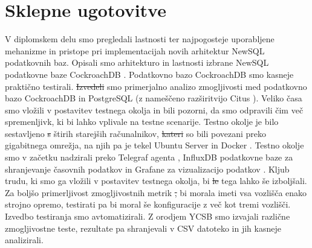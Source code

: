 \documentclass[a4paper, 12pt]{book}
\providecommand{\DIFaddtex}[1]{{\protect\color{blue}\uwave{#1}}} %
\providecommand{\DIFdeltex}[1]{{\protect\color{red}\sout{#1}}}                      %
\providecommand{\DIFaddbegin}{} %
\providecommand{\DIFaddend}{} %
\providecommand{\DIFdelbegin}{} %
\providecommand{\DIFdelend}{} %
\providecommand{\DIFadd}[1]{\texorpdfstring{\DIFaddtex{#1}}{#1}} %
\providecommand{\DIFdel}[1]{\texorpdfstring{\DIFdeltex{#1}}{}} %
\newcommand{\DIFscaledelfig}{0.5}
\newlength{\DIFdelgraphicswidth} %
\newlength{\DIFdelgraphicsheight} %
\newcommand{\DIFaddincludegraphics}[2][]{{\color{blue}\fbox{\DIFOincludegraphics[#1]{#2}}}} %
\newcommand{\DIFdelincludegraphics}[2][]{%
\sbox{\DIFdelgraphicsbox}{\DIFOincludegraphics[#1]{#2}}%
\settoboxwidth{\DIFdelgraphicswidth}{\DIFdelgraphicsbox} %
\settoboxtotalheight{\DIFdelgraphicsheight}{\DIFdelgraphicsbox} %
\scalebox{\DIFscaledelfig}{%
\parbox[b]{\DIFdelgraphicswidth}{\usebox{\DIFdelgraphicsbox}\\[-\baselineskip] \rule{\DIFdelgraphicswidth}{0em}}\llap{\resizebox{\DIFdelgraphicswidth}{\DIFdelgraphicsheight}{%
\setlength{\unitlength}{\DIFdelgraphicswidth}%
\begin{picture}(1,1)%
\thicklines\linethickness{2pt} %
{\color[rgb]{1,0,0}\put(0,0){\framebox(1,1){}}}%
{\color[rgb]{1,0,0}\put(0,0){\line( 1,1){1}}}%
{\color[rgb]{1,0,0}\put(0,1){\line(1,-1){1}}}%
\end{picture}%
}\hspace*{3pt}}} %
} %
\DeclareRobustCommand{\DIFaddbegin}{\DIFOaddbegin \let\includegraphics\DIFaddincludegraphics} %
\DeclareRobustCommand{\DIFaddend}{\DIFOaddend \let\includegraphics\DIFOincludegraphics} %
\DeclareRobustCommand{\DIFdelbegin}{\DIFOdelbegin \let\includegraphics\DIFdelincludegraphics} %
\DeclareRobustCommand{\DIFdelend}{\DIFOaddend \let\includegraphics\DIFOincludegraphics} %
\begin{document}
\chapter{Sklepne ugotovitve}

V diplomskem delu smo pregledali lastnosti  ter najpogosteje uporabljene mehanizme in pristope pri implementacijah novih arhitektur NewSQL podatkovnih baz. Opisali smo arhitekturo in lastnosti izbrane NewSQL podatkovne baze CockroachDB \cite{CRDB-home}. Podatkovno bazo CockroachDB smo kasneje praktično testirali. \DIFdelbegin \DIFdel{Izvedeli }\DIFdelend \DIFaddbegin \DIFadd{Izvedli }\DIFaddend smo primerjalno analizo zmogljivosti med podatkovno bazo CockroachDB in PostgreSQL \cite{postgres} (z nameščeno razširitvijo Citus \cite{citus}). Veliko časa smo vložili v postavitev testnega okolja in bili pozorni, da smo odpravili čim več spremenljivk, ki bi lahko vplivale na testne scenarije. Testno okolje je bilo sestavljeno \DIFdelbegin \DIFdel{s }\DIFdelend \DIFaddbegin \DIFadd{iz }\DIFaddend štirih starejših računalnikov, \DIFdelbegin \DIFdel{kateri }\DIFdelend \DIFaddbegin \DIFadd{ki }\DIFaddend so bili povezani preko gigabitnega omrežja, na njih pa je tekel Ubuntu Server \cite{ubuntu-server} in Docker \cite{docker}. Testno okolje smo v začetku nadzirali preko Telegraf agenta \cite{telegraf}, InfluxDB podatkovne baze za shranjevanje časovnih podatkov \cite{influxdb} in Grafane za vizualizacijo podatkov \cite{grafana}. Kljub trudu, ki smo ga vložili v postavitev testnega okolja, bi \DIFdelbegin \DIFdel{le }\DIFdelend tega lahko še izboljšali. Za boljšo primerljivost zmogljivostnih metrik \DIFdelbegin \DIFdel{, }\DIFdelend bi morala imeti vsa vozlišča enako strojno opremo, testirati pa bi moral še konfiguracije z več kot tremi vozlišči. Izvedbo testiranja smo avtomatizirali. Z orodjem YCSB \cite{brianfrankcooper/YCSB} smo izvajali različne zmogljivostne teste, rezultate pa shranjevali v CSV datoteko in jih kasneje analizirali.
\end{document}
